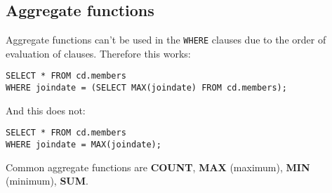 %

\color{red}
\subsection{Aggregate functions}
Aggregate functions can't be used in the \texttt{WHERE} clauses due to the order of evaluation of clauses. Therefore this works:
\begin{verbatim}
SELECT * FROM cd.members
WHERE joindate = (SELECT MAX(joindate) FROM cd.members);
\end{verbatim}
And this does not:
\begin{verbatim}
SELECT * FROM cd.members
WHERE joindate = MAX(joindate);
\end{verbatim}

Common aggregate functions are
\textbf{COUNT},
\textbf{MAX} (maximum),
\textbf{MIN} (minimum),
\textbf{SUM}.

%